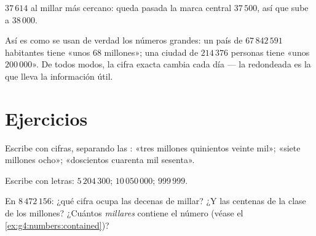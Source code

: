 \begin{omfigure}

{\small {} $37\,614$ al millar más cercano: queda pasada la
marca central $37\,500$, así que sube a $38\,000$.}
\end{omfigure}

\begin{example}\label{ex:g4:numbers:world}
Así es como se usan de verdad los números grandes: un país de
$67\,842\,591$ habitantes tiene «unos $68$ millones»; una ciudad de
$214\,376$ personas tiene «unos $200\,000$». De todos modos, la cifra exacta cambia
cada día --- la redondeada es la que lleva la información
útil.
\end{example}

\section{Ejercicios}

\begin{exercise}[$\star$]\label{exo:g4:numbers:1}
Escribe con cifras, separando las : «tres millones quinientos
veinte mil»; «siete millones ocho»; «doscientos
cuarenta mil sesenta».
\end{exercise}

\begin{exercise}[$\star$]\label{exo:g4:numbers:2}
Escribe con letras: $5\,204\,300$; \quad $10\,050\,000$; \quad
$999\,999$.
\end{exercise}

\begin{exercise}[$\star$]\label{exo:g4:numbers:3}
En $8\,472\,156$: ¿qué cifra ocupa las decenas de millar? ¿Y las centenas
de la clase de los millones? ¿Cuántos \emph{millares} contiene el número
(véase el \cref{ex:g4:numbers:contained})?
\end{exercise}

